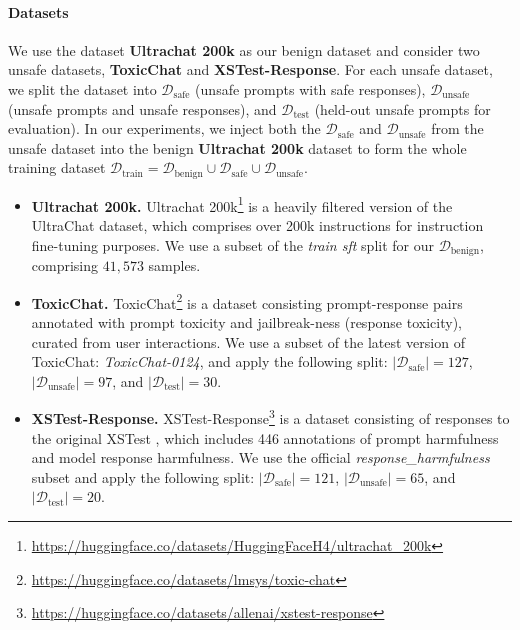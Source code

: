 \documentclass[11pt]{article}
\begin{document}
\paragraph{Datasets} We use the dataset \textbf{Ultrachat 200k} as our benign dataset and consider two unsafe datasets, \textbf{ToxicChat} and \textbf{XSTest-Response}. For each unsafe dataset, we split the dataset into $\mathcal{D}_{\text{safe}}$ (unsafe prompts with safe responses), $\mathcal{D}_{\text{unsafe}}$ (unsafe prompts and unsafe responses), and $\mathcal{D}_{\text{test}}$ (held-out unsafe prompts for evaluation). In our experiments, we inject both the $\mathcal{D}_{\text{safe}}$ and $\mathcal{D}_{\text{unsafe}}$ from the unsafe dataset into the benign \textbf{Ultrachat 200k} dataset to form the whole training dataset $\mathcal{D}_{\text{train}} = \mathcal{D}_{\text{benign}} \cup \mathcal{D}_{\text{safe}} \cup \mathcal{D}_{\text{unsafe}}$.

\begin{itemize}
    \item \textbf{Ultrachat 200k.}
Ultrachat 200k\footnote{\url{https://huggingface.co/datasets/HuggingFaceH4/ultrachat_200k}} is a heavily filtered version of the UltraChat \cite{ding2023enhancing} dataset, which comprises over 200k instructions for instruction fine-tuning purposes. We use a subset of the \textit{train sft} split for our $\mathcal{D}_{\text{benign}}$, comprising $41,573$ samples. 
    \item \textbf{ToxicChat.} ToxicChat\footnote{\url{https://huggingface.co/datasets/lmsys/toxic-chat}} \cite{lin2023toxicchat} is a dataset consisting 
    prompt-response pairs annotated with prompt toxicity and jailbreak-ness (response toxicity), curated from user interactions. We use a subset of the latest version of ToxicChat: \textit{ToxicChat-0124}, and apply the following split: $|\mathcal{D}_{\text{safe}}| = 127$, $|\mathcal{D}_{\text{unsafe}}| = 97$, and $|\mathcal{D}_{\text{test}}|   = 30$.
    \item \textbf{XSTest-Response.} XSTest-Response\footnote{\url{https://huggingface.co/datasets/allenai/xstest-response}} \cite{han2024wildguardopenonestopmoderation} is a dataset consisting of responses to the original XSTest \cite{rottger2023xstest}, which includes 446 annotations of prompt harmfulness and model response harmfulness. We use the official \textit{response\_harmfulness} subset and apply the following split: $|\mathcal{D}_{\text{safe}}| = 121$, $|\mathcal{D}_{\text{unsafe}}| = 65$, and $|\mathcal{D}_{\text{test}}| = 20$.
\end{itemize}
\end{document}
